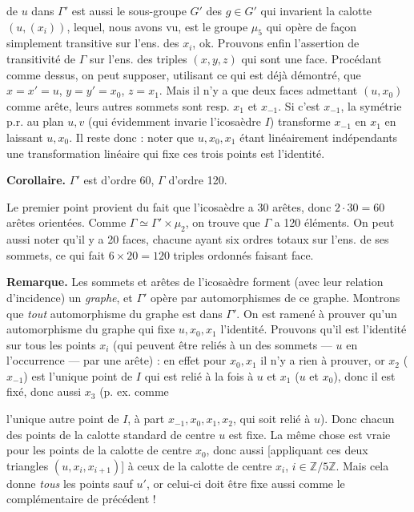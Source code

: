 \documentclass[11pt,a4paper]{article}
\begin{document}
de $u$ dans $\Gamma'$ est aussi le sous-groupe  $G'$  des $g \in G'$ qui invarient la calotte $(u, (x_i))$, lequel, nous avons vu, est le groupe $\mu_5$ qui opère de façon simplement transitive sur l'ens. des $x_i$, ok.
Prouvons enfin l'assertion de  transitivité de $\Gamma$ sur l'ens. des  triples $(x,y,z)$ qui sont une face. Procédant comme dessus, on peut supposer, utilisant ce qui est déjà démontré, que $x = x' = u$, $y = y' = x_0$, $z = x_1$. Mais il n'y a que deux  faces \struck{\ill{}} admettant $(u, x_0)$ comme arête, leurs autres sommets sont resp. $x_1$ et $x_{-1}$. Si c'est $x_{-1}$, la symétrie p.r. au plan $u, v$ (qui évidemment invarie l'icosaèdre $I$) transforme $x_{-1}$ en $x_1$ en laissant $u, x_0$. Il reste donc :  noter que $u, x_0, x_1$ \struck{\ill{}} étant linéairement indépendants une transformation linéaire qui fixe ces trois points est l'identité.

\textbf{Corollaire.} $\Gamma'$ est d'ordre 60, $\Gamma$ d'ordre 120.

Le premier point provient du fait que l'icosaèdre a 30 arêtes, donc $2 \cdot 30 = 60$ arêtes orientées. Comme $\Gamma \simeq \Gamma' \times \mu_2$, on trouve que $\Gamma$ a 120 éléments. On peut aussi noter qu'il y a 20 faces, chacune ayant  six ordres totaux sur l'ens. de ses sommets, ce qui fait $6 \times 20 = 120$ triples ordonnés faisant face.

\textbf{Remarque.} Les sommets et arêtes de l'icosaèdre forment (avec leur relation d'incidence) un \emph{graphe}, et $\Gamma'$ opère par automorphismes de ce graphe. Montrons que \emph{tout} automorphisme  du graphe est dans $\Gamma'$. On est ramené à \struck{\ill{}} prouver  qu'un automorphisme du graphe qui fixe $u, x_0, x_1$  l'identité. Prouvons qu'il est l'identité sur tous les points $x_i$ (qui peuvent être reliés à \struck{\ill{}} un des sommets --- $u$ en l'occurrence --- par une arête)  : en effet \struck{\ill{}} pour $x_0, x_1$ il n'y a rien à prouver, or $x_2$ ($x_{-1}$) est l'unique point de $I$  qui est relié  à la fois à $u$ et $x_1$ ($u$ et $x_0$), donc il est fixé, donc aussi $x_3$ (p. ex. comme

l'unique autre point de $I$, à part $x_{-1}, x_0, x_1, x_2$, qui soit relié à $u$). Donc  chacun des points  de la calotte standard \struck{\ill{}} de centre $u$ est fixe. La même chose est vraie pour les points de la calotte de centre $x_0$, donc aussi [appliquant ces deux triangles $(u, x_i, x_{i+1})$] à ceux de la calotte de centre $x_i$, $i \in \mathbb{Z}/5\mathbb{Z}$. Mais cela donne \emph{tous} les points  sauf $u'$, or celui-ci doit être fixe aussi comme le complémentaire de  précédent !
\end{document}
